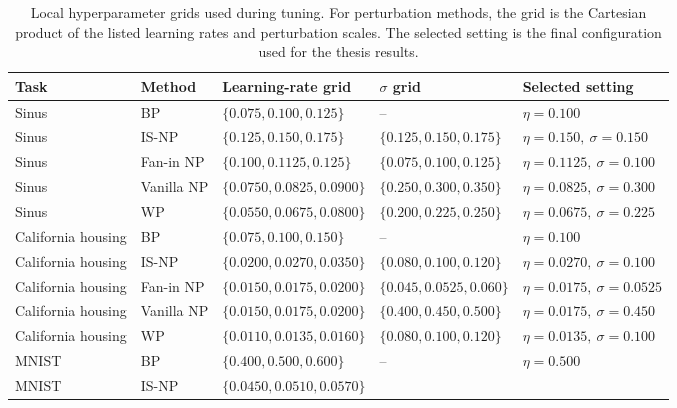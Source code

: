 \begin{table}
\centering
\scriptsize
\caption{Local hyperparameter grids used during tuning. For perturbation methods, the grid is the Cartesian product of the listed learning rates and perturbation scales. The selected setting is the final configuration used for the thesis results.}
\label{tab:hyperparameter_search_grids}
\begin{tabularx}{\textheight}{
    >{\raggedright\arraybackslash}p{2.3cm}
    >{\raggedright\arraybackslash}p{2.2cm}
    >{\raggedright\arraybackslash}X
    >{\raggedright\arraybackslash}X
    >{\raggedright\arraybackslash}p{4.1cm}
}
\toprule
\textbf{Task} &
\textbf{Method} &
\textbf{Learning-rate grid} &
\textbf{\(\sigma\) grid} &
\textbf{Selected setting} \\
\midrule
Sinus &
BP &
\(\{0.075, 0.100, 0.125\}\) &
-- &
\textbf{\(\eta=0.100\)} \\
Sinus &
IS-NP &
\(\{0.125, 0.150, 0.175\}\) &
\(\{0.125, 0.150, 0.175\}\) &
\textbf{\(\eta=0.150,\ \sigma=0.150\)} \\
Sinus &
Fan-in NP &
\(\{0.100, 0.1125, 0.125\}\) &
\(\{0.075, 0.100, 0.125\}\) &
\textbf{\(\eta=0.1125,\ \sigma=0.100\)} \\
Sinus &
Vanilla NP &
\(\{0.0750, 0.0825, 0.0900\}\) &
\(\{0.250, 0.300, 0.350\}\) &
\textbf{\(\eta=0.0825,\ \sigma=0.300\)} \\
Sinus &
WP &
\(\{0.0550, 0.0675, 0.0800\}\) &
\(\{0.200, 0.225, 0.250\}\) &
\textbf{\(\eta=0.0675,\ \sigma=0.225\)} \\
\addlinespace
California housing &
BP &
\(\{0.075, 0.100, 0.150\}\) &
-- &
\textbf{\(\eta=0.100\)} \\
California housing &
IS-NP &
\(\{0.0200, 0.0270, 0.0350\}\) &
\(\{0.080, 0.100, 0.120\}\) &
\textbf{\(\eta=0.0270,\ \sigma=0.100\)} \\
California housing &
Fan-in NP &
\(\{0.0150, 0.0175, 0.0200\}\) &
\(\{0.045, 0.0525, 0.060\}\) &
\textbf{\(\eta=0.0175,\ \sigma=0.0525\)} \\
California housing &
Vanilla NP &
\(\{0.0150, 0.0175, 0.0200\}\) &
\(\{0.400, 0.450, 0.500\}\) &
\textbf{\(\eta=0.0175,\ \sigma=0.450\)} \\
California housing &
WP &
\(\{0.0110, 0.0135, 0.0160\}\) &
\(\{0.080, 0.100, 0.120\}\) &
\textbf{\(\eta=0.0135,\ \sigma=0.100\)} \\
\addlinespace
MNIST &
BP &
\(\{0.400, 0.500, 0.600\}\) &
-- &
\textbf{\(\eta=0.500\)} \\
MNIST &
IS-NP &
\(\{0.0450, 0.0510, 0.0570\}\) &

\end{tabularx}
\end{table}
